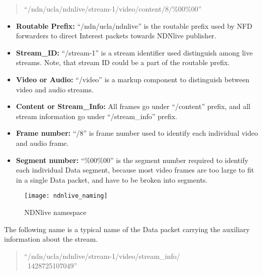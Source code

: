 \begin{quote}
``/ndn/ucla/ndnlive/stream-1/video/content/8/\%00\%00''
\end{quote}
\begin{itemize}
	\item{\textbf{Routable Prefix:}} ``/ndn/ucla/ndnlive'' is the routable prefix used by NFD forwarders to direct  Interest packets towards NDNlive publisher.
	\item{\textbf{Stream\_ID:}} ``/stream-1'' is a stream identifier used distinguish among live streams. Note, that stream ID could be a part of the routable prefix.
	\item{\textbf{Video or Audio:}} ``/video'' is a markup component to distinguish between video and audio streams.
	\item{\textbf{Content or Stream\_Info:}} All frames go under ``/content'' prefix, and all stream information go under ``/stream\_info'' prefix.
	\item{\textbf{Frame number:}} ``/8'' is frame number used to identify each individual video and audio frame.
	\item{\textbf{Segment number:}} ``\%00\%00'' is the segment number required to identify each individual Data segment, because most video frames are too large to fit in a single Data packet, and have to be broken into segments. 
	
\end{itemize}


\begin{figure}%
  \centering
  \texttt{[image: ndnlive\_naming]}
  \vspace{-0.3cm}
  \caption{NDNlive namespace}
  \label{fig:ndnlive_naming}
\end{figure}


The following name is a typical name of the Data packet carrying the auxiliary information about the stream.
\begin{quote}
``/ndn/ucla/ndnlive/stream-1/video/stream\_info/ \\\ 1428725107049''
\end{quote}

